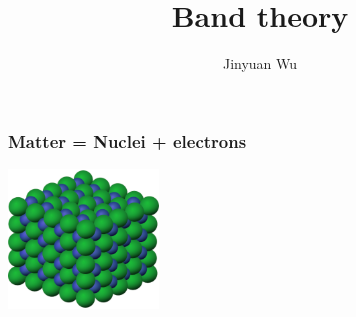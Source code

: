 \documentclass{beamer}
\title{Band theory}
\author{Jinyuan Wu}
\begin{document}
\frame{\titlepage}

\begin{frame}
\frametitle{Matter = Nuclei + electrons}

\begin{center}
  \includegraphics[width=0.3\textwidth]{lattices/crystal-example.png}
\end{center}

\begin{center}
    \begin{tikzpicture}[x=0.75pt,y=0.75pt,yscale=-1,xscale=1]
        

\end{tikzpicture}
\end{center}
\end{frame}
\end{document}
